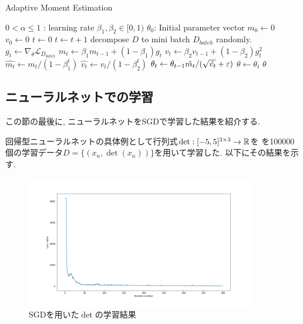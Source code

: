 \begin{algorithm}[H]
    \caption{Adaptive Moment Estimation}
    \begin{algorithmic}
        \REQUIRE $0<\alpha\leq 1$ : learning rate
        \REQUIRE $\beta_{1}, \beta_{2}\in[0, 1)$
        \REQUIRE $\theta_{0}$: Initial parameter vector
        \STATE $m_{0}\leftarrow 0$
        \STATE $v_{0}\leftarrow 0$
        \STATE $t\leftarrow 0$
        \STATE $t\leftarrow t + 1$
        \STATE decompose $D$ to mini batch $D_{batch}$ randomly.
        \STATE $g_{t}\leftarrow \nabla_{\theta}\mathcal{L}_{D_{batch}}$
        \STATE $m_{t}\leftarrow\beta_{1} m_{t - 1} + (1 - \beta_{1})g_{t}$
        \STATE $v_{t}\leftarrow\beta_{2} v_{t - 1} + (1 - \beta_{2})g_{t}^{2}$
        \STATE $\hat{m_{t}}\leftarrow m_{t}/(1 - \beta_{1}^{t})$
        \STATE $\hat{v_{t}}\leftarrow v_{t}/(1 - \beta_{2}^{t})$
        \STATE $\theta_{t}\leftarrow\theta_{t - 1}\hat{m_{t}}/(\sqrt{\hat{v_{t}}} + \varepsilon)$
        \ENDFOR
        \STATE $\theta\leftarrow\theta_{t}$
        \ENDWHILE
        \RETURN $\theta$
    \end{algorithmic}
\end{algorithm}
\subsection{ニューラルネットでの学習}
この節の最後に, ニューラルネットをSGDで学習した結果を紹介する. 
\begin{Ex}
    回帰型ニューラルネットの具体例として行列式$\det :[-5, 5]^{3\times 3}\to\mathbb{R}$を
    を100000個の学習データ$D = \{(x_{n}, \det(x_n))\}$を用いて学習した. 以下にその結果を示す. 
    \begin{figure}[H]
        \centering
        \includegraphics[width=10.1cm]{Images/det_train_loss.png}
        \caption{SGDを用いた$\det$の学習結果}
    \end{figure}
\end{Ex}
